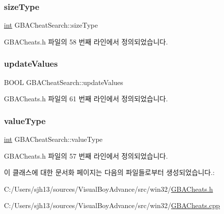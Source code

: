 \subsubsection{\texorpdfstring{size\+Type}{sizeType}}
{\footnotesize\ttfamily \mbox{\hyperlink{_util_8cpp_a0ef32aa8672df19503a49fab2d0c8071}{int}} G\+B\+A\+Cheat\+Search\+::size\+Type}



G\+B\+A\+Cheats.\+h 파일의 58 번째 라인에서 정의되었습니다.

\mbox{\label{class_g_b_a_cheat_search_a1b8eec1d7b81c1e297b71c4de071550f}} 
\subsubsection{\texorpdfstring{update\+Values}{updateValues}}
{\footnotesize\ttfamily B\+O\+OL G\+B\+A\+Cheat\+Search\+::update\+Values}



G\+B\+A\+Cheats.\+h 파일의 61 번째 라인에서 정의되었습니다.

\mbox{\label{class_g_b_a_cheat_search_a633f5b523a814d3f1e4cb06b1799b798}} 
\subsubsection{\texorpdfstring{value\+Type}{valueType}}
{\footnotesize\ttfamily \mbox{\hyperlink{_util_8cpp_a0ef32aa8672df19503a49fab2d0c8071}{int}} G\+B\+A\+Cheat\+Search\+::value\+Type}



G\+B\+A\+Cheats.\+h 파일의 57 번째 라인에서 정의되었습니다.



이 클래스에 대한 문서화 페이지는 다음의 파일들로부터 생성되었습니다.\+:\begin{DoxyCompactItemize}
\item 
C\+:/\+Users/sjh13/sources/\+Visual\+Boy\+Advance/src/win32/\mbox{\hyperlink{_g_b_a_cheats_8h}{G\+B\+A\+Cheats.\+h}}\item 
C\+:/\+Users/sjh13/sources/\+Visual\+Boy\+Advance/src/win32/\mbox{\hyperlink{_g_b_a_cheats_8cpp}{G\+B\+A\+Cheats.\+cpp}}\end{DoxyCompactItemize}
